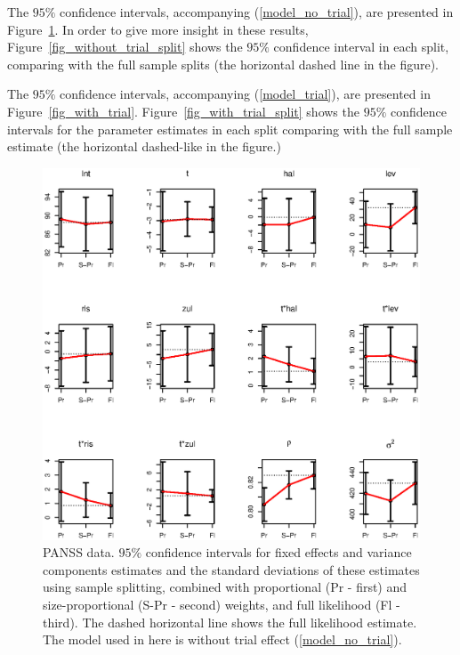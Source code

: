 \documentclass[11pt,a5paper,twoside]{book}
\begin{document}
{The $95\%$ confidence intervals, accompanying (\ref{model_no_trial}), are presented in Figure~\ref{fig_without_trial}. In order to give more insight in these results, Figure~\ref{fig_without_trial_split} shows the $95\%$ confidence interval in each split, comparing with the full sample splits (the horizontal dashed line in the figure).

The $95\%$ confidence intervals, accompanying (\ref{model_trial}), are presented in Figure~\ref{fig_with_trial}. Figure~\ref{fig_with_trial_split} shows the $95\%$ confidence intervals for the parameter estimates in each split comparing with the full sample estimate (the horizontal dashed-like in the figure.)


\begin{figure}[ht]
\centering
\includegraphics[width=\textwidth]{without_trial.eps}
\caption[PANSS data. $95\%$ confidence intervals for fixed effects and variance components estimates and the standard deviations of these estimates using sample splitting, combined with proportional and size-proportional weights, and full likelihood (without trial model)]{PANSS data. $95\%$ confidence intervals for fixed effects and variance components estimates and the standard deviations of these estimates using sample splitting, combined with proportional (Pr - first) and size-proportional (S-Pr - second) weights, and full likelihood (Fl - third). The dashed horizontal line shows the full likelihood estimate. The model used in here is without trial effect (\ref{model_no_trial}).} \label{fig_without_trial}
\end{figure}

}
\end{document}

